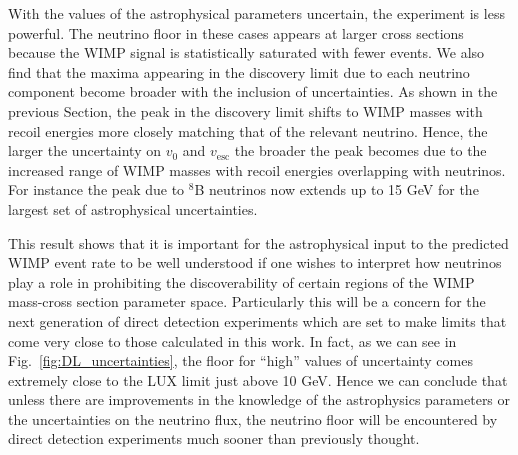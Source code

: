 With the values of the astrophysical parameters uncertain, the experiment is less powerful. The neutrino floor in these cases appears at larger cross sections because the WIMP signal is statistically saturated with fewer events. We also find that the maxima appearing in the discovery limit due to each neutrino component become broader with the inclusion of uncertainties. As shown in the previous Section, the peak in the discovery limit shifts to WIMP masses with recoil energies more closely matching that of the relevant neutrino. Hence, the larger the uncertainty on $v_0$ and $v_\textrm{esc}$ the broader the peak becomes due to the increased range of WIMP masses with recoil energies overlapping with neutrinos. For instance the peak due to $^8$B neutrinos now extends up to 15 GeV for the largest set of astrophysical uncertainties.

This result shows that it is important for the astrophysical input to the predicted WIMP event rate to be well understood if one wishes to interpret how neutrinos play a role in prohibiting the discoverability of certain regions of the WIMP mass-cross section parameter space. Particularly this will be a concern for the next generation of direct detection experiments which are set to make limits that come very close to those calculated in this work. In fact, as we can see in Fig.~\ref{fig:DL_uncertainties}, the floor for ``high'' values of uncertainty comes extremely close to the LUX limit just above 10 GeV. Hence we can conclude that unless there are improvements in the knowledge of the astrophysics parameters or the uncertainties on the neutrino flux, the neutrino floor will be encountered by direct detection experiments much sooner than previously thought.


